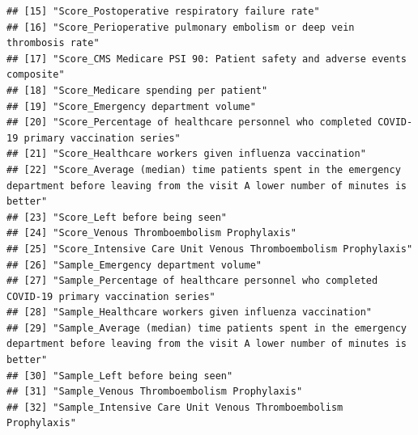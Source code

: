 \documentclass[
]{article}
\begin{document}
\begin{verbatim}
## [15] "Score_Postoperative respiratory failure rate"                                                                                             
## [16] "Score_Perioperative pulmonary embolism or deep vein thrombosis rate"                                                                      
## [17] "Score_CMS Medicare PSI 90: Patient safety and adverse events composite"                                                                   
## [18] "Score_Medicare spending per patient"                                                                                                      
## [19] "Score_Emergency department volume"                                                                                                        
## [20] "Score_Percentage of healthcare personnel who completed COVID-19 primary vaccination series"                                               
## [21] "Score_Healthcare workers given influenza vaccination"                                                                                     
## [22] "Score_Average (median) time patients spent in the emergency department before leaving from the visit A lower number of minutes is better" 
## [23] "Score_Left before being seen"                                                                                                             
## [24] "Score_Venous Thromboembolism Prophylaxis"                                                                                                 
## [25] "Score_Intensive Care Unit Venous Thromboembolism Prophylaxis"                                                                             
## [26] "Sample_Emergency department volume"                                                                                                       
## [27] "Sample_Percentage of healthcare personnel who completed COVID-19 primary vaccination series"                                              
## [28] "Sample_Healthcare workers given influenza vaccination"                                                                                    
## [29] "Sample_Average (median) time patients spent in the emergency department before leaving from the visit A lower number of minutes is better"
## [30] "Sample_Left before being seen"                                                                                                            
## [31] "Sample_Venous Thromboembolism Prophylaxis"                                                                                                
## [32] "Sample_Intensive Care Unit Venous Thromboembolism Prophylaxis"                                                                            

\end{verbatim}
\end{document}
